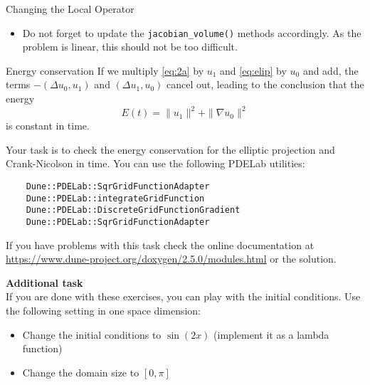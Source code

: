 \documentclass[12pt,a4paper]{article}
\begin{document}
\begin{Exercise}{Changing the Local Operator}
\begin{itemize}
See how it is done for the $\Delta u_0$, we recall the corresponding part of \lstinline{WaveL2::alpha_volume()}:
  \begin{lstlisting}
// integrate u*phi_i
for (size_t i=0; i<lfsu0.size(); i++) {
	r.accumulate(lfsu0,i,u1*phihat[i]*factor);
	r.accumulate(lfsu1,i,u0*phihat[i]*factor);
}
  \end{lstlisting}

\item Do not forget to update the \lstinline{jacobian_volume()} methods accordingly. As the problem is linear, this should not be too difficult.
\end{itemize}
\end{Exercise}
\begin{Exercise}{Energy conservation}
If we multiply \eqref{eq:2a} by $u_1$ and \eqref{eq:elip} by $u_0$ and add, the terms $-(\Delta u_0,u_1 )$ and $(\Delta u_1,u_0 )$ cancel out, leading to the conclusion that the energy $$E(t) = \|u_1\|^2 + \| \nabla u_0\|^2 $$
is constant in time.


Your task is to check the energy conservation for the elliptic projection and Crank-Nicolson in time. You can use the following PDELab utilities:
  \begin{lstlisting}
	Dune::PDELab::SqrGridFunctionAdapter
	Dune::PDELab::integrateGridFunction
	Dune::PDELab::DiscreteGridFunctionGradient
	Dune::PDELab::SqrGridFunctionAdapter
  \end{lstlisting}

If you have problems with this task check the online documentation at
\url{https://www.dune-project.org/doxygen/2.5.0/modules.html} or the solution.
\end{Exercise}

\textbf{Additional task}\\
If you are done with these exercises, you can play with the initial conditions. Use the following setting in one space dimension:
\begin{itemize}
\item Change  the initial conditions to $\sin(2x)$ (implement it as a lambda function)
\item Change the domain size to $[0,\pi]$
\end{itemize}




\end{document}
